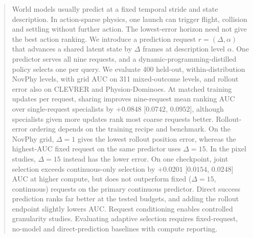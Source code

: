 \begin{abstract}
\begin{revblock}
World models usually predict at a fixed temporal stride and state description. In action-sparse physics, one launch can trigger flight, collision and settling without further action. The lowest-error horizon need not give the best action ranking. We introduce a prediction request $r=(\Delta,\alpha)$ that advances a shared latent state by $\Delta$ frames at description level $\alpha$. One predictor serves all nine requests, and a dynamic-programming-distilled policy selects one per query. We evaluate 400 held-out, within-distribution NovPhy levels, with grid AUC on 311 mixed-outcome levels, and rollout error also on CLEVRER and Physion-Dominoes. At matched training updates per request, sharing improves nine-request mean ranking AUC over single-request specialists by $+0.0848$ [$0.0742$, $0.0952$], although specialists given more updates rank most coarse requests better. Rollout-error ordering depends on the training recipe and benchmark. On the NovPhy grid, $\Delta=1$ gives the lowest rollout position error, whereas the highest-AUC fixed request on the same predictor uses $\Delta=15$. In the pixel studies, $\Delta=15$ instead has the lower error. On one checkpoint, joint selection exceeds continuous-only selection by $+0.0201$ [$0.0154$, $0.0248$] AUC at higher compute, but does not outperform fixed ($\Delta=15$, continuous) requests on the primary continuous predictor. Direct success prediction ranks far better at the tested budgets, and adding the rollout endpoint slightly lowers AUC. Request conditioning enables controlled granularity studies. Evaluating adaptive selection requires fixed-request, no-model and direct-prediction baselines with compute reporting.
\end{revblock}
\end{abstract}
